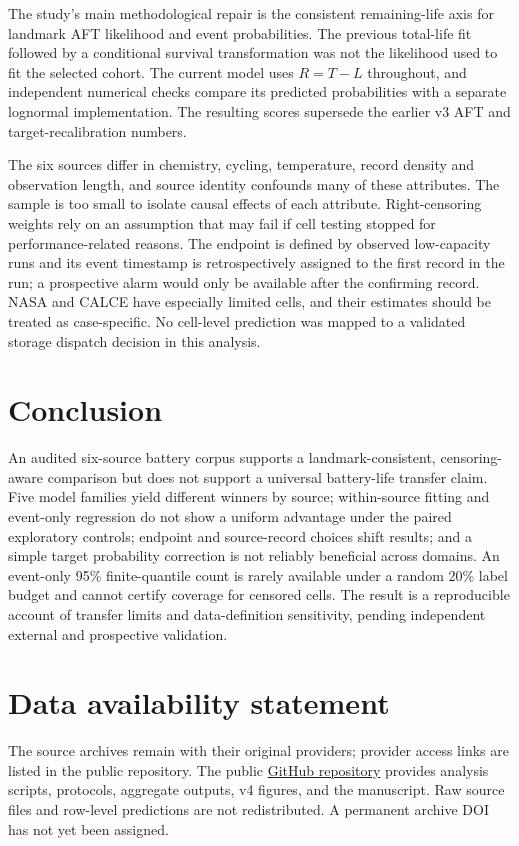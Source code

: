 \documentclass[preprint,12pt]{elsarticle}
\begin{document}
The study's main methodological repair is the consistent remaining-life axis for landmark AFT likelihood and event probabilities. The previous total-life fit followed by a conditional survival transformation was not the likelihood used to fit the selected cohort. The current model uses $R=T-L$ throughout, and independent numerical checks compare its predicted probabilities with a separate lognormal implementation. The resulting scores supersede the earlier v3 AFT and target-recalibration numbers.

The six sources differ in chemistry, cycling, temperature, record density and observation length, and source identity confounds many of these attributes. The sample is too small to isolate causal effects of each attribute. Right-censoring weights rely on an assumption that may fail if cell testing stopped for performance-related reasons. The endpoint is defined by observed low-capacity runs and its event timestamp is retrospectively assigned to the first record in the run; a prospective alarm would only be available after the confirming record. NASA and CALCE have especially limited cells, and their estimates should be treated as case-specific. No cell-level prediction was mapped to a validated storage dispatch decision in this analysis.

\section{Conclusion}
An audited six-source battery corpus supports a landmark-consistent, censoring-aware comparison but does not support a universal battery-life transfer claim. Five model families yield different winners by source; within-source fitting and event-only regression do not show a uniform advantage under the paired exploratory controls; endpoint and source-record choices shift results; and a simple target probability correction is not reliably beneficial across domains. An event-only 95\% finite-quantile count is rarely available under a random 20\% label budget and cannot certify coverage for censored cells. The result is a reproducible account of transfer limits and data-definition sensitivity, pending independent external and prospective validation.

\section*{Data availability statement}
The source archives remain with their original providers; provider access links are listed in the public repository. The public \href{https://github.com/whuaying/cross-dataset-battery-lifetime-prediction}{GitHub repository} provides analysis scripts, protocols, aggregate outputs, v4 figures, and the manuscript. Raw source files and row-level predictions are not redistributed. A permanent archive DOI has not yet been assigned.
\end{document}
